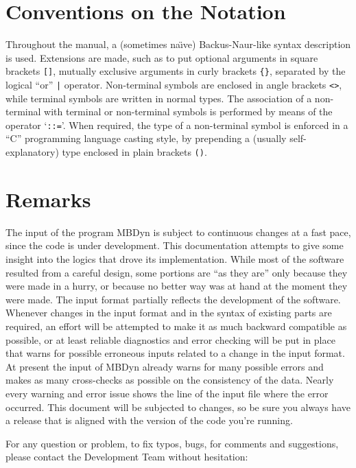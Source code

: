 \documentclass[10pt,dvips]{report}
\newcommand{\kw}[1]{\texttt{#1}}
\begin{document}
\section*{Conventions on the Notation}
Throughout the manual, a (sometimes na\"{\i}ve) 
Backus-Naur-like syntax description is used. 
Extensions are made, such as to put optional arguments in square brackets
\kw{[]}, mutually exclusive arguments in curly brackets \kw{\{\}},
separated by the logical ``or'' \kw{|} operator.
Non-terminal symbols are enclosed in angle brackets \kw{<>}, while
terminal symbols are written in normal types.
The association of a non-terminal with terminal or non-terminal
symbols is performed by means of the operator `\kw{::=}'. 
When required, the type of a non-terminal symbol is enforced in a ``C''
programming language casting style, by prepending a (usually
self-explanatory) type enclosed in plain brackets \kw{()}.


\section*{Remarks}
The input of the program MBDyn is subject to continuous changes
at a fast pace, since the code is under development.
This documentation attempts to give some insight into the logics 
that drove its implementation.
While most of the software resulted from a careful design, 
some portions are ``as they are'' only because they were made in a hurry, 
or because no better way was at hand at the moment they were made.
The input format partially reflects the development of the software.
Whenever changes in the input format and in the syntax 
of existing parts are required, an effort will be attempted to make 
it as much backward compatible as possible, or at least reliable 
diagnostics and error checking will be put in place that warns 
for possible erroneous inputs related to a change in the input format. 
At present the input of MBDyn already warns for many possible errors 
and makes as many cross-checks as possible on the consistency of the data. 
Nearly every warning and error issue shows the line of the input file 
where the error occurred. 
This document will be subjected to changes, so be sure you always have 
a release that is aligned with the version of the code you're running.

For any question or problem, to fix typos, bugs, for comments and
suggestions, please contact the Development Team
without hesitation:\vspace{10mm}\\
\end{document}
